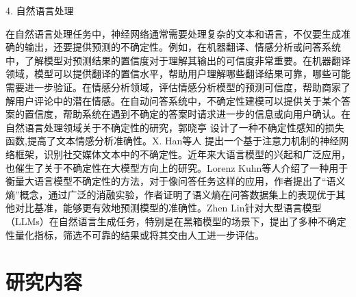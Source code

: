 4. 自然语言处理

在自然语言处理任务中，神经网络通常需要处理复杂的文本和语言，不仅要生成准确的输出，还要提供预测的不确定性。例如，在机器翻译、情感分析或问答系统中，了解模型对预测结果的置信度对于理解其输出的可信度非常重要。在机器翻译领域，模型可以提供翻译的置信水平，帮助用户理解哪些翻译结果可靠，哪些可能需要进一步验证。在情感分析领域，评估情感分析模型的预测可信度，帮助商家了解用户评论中的潜在情感。在自动问答系统中，不确定性建模可以提供关于某个答案的置信度，帮助系统在遇到不确定的答案时请求进一步的信息或向用户确认。在自然语言处理领域关于不确定性的研究，郭晓亭\cite{1022812574.nh} 设计了一种不确定性感知的损失函数,提高了文本情感分析准确性。X. Han等人\cite{han2019attention} 提出一个基于注意力机制的神经网络框架，识别社交媒体文本中的不确定性。近年来大语言模型的兴起和广泛应用，也催生了关于不确定性在大模型方向上的研究。Lorenz Kuhn等人\cite{kuhn2023semantic}介绍了一种用于衡量大语言模型不确定性的方法，对于像问答任务这样的应用，作者提出了“语义熵”概念，通过广泛的消融实验，作者证明了语义熵在问答数据集上的表现优于其他对比基准，能够更有效地预测模型的准确性。Zhen Lin\cite{lin2024generating}针对大型语言模型（LLMs）在自然语言生成任务，特别是在黑箱模型的场景下，提出了多种不确定性量化指标，筛选不可靠的结果或将其交由人工进一步评估。




\section{研究内容}

